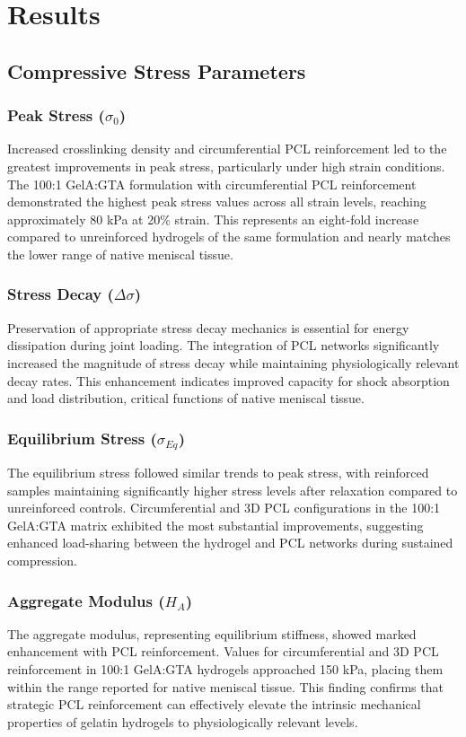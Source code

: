 \section{Results}
\subsection{Compressive Stress Parameters}

\subsubsection{Peak Stress ($\sigma_0$)}
Increased crosslinking density and circumferential PCL reinforcement led to the greatest improvements in peak stress, particularly under high strain conditions. The 100:1 GelA:GTA formulation with circumferential PCL reinforcement demonstrated the highest peak stress values across all strain levels, reaching approximately 80 kPa at 20\% strain. This represents an eight-fold increase compared to unreinforced hydrogels of the same formulation and nearly matches the lower range of native meniscal tissue.

\subsubsection{Stress Decay ($\Delta\sigma$)}
Preservation of appropriate stress decay mechanics is essential for energy dissipation during joint loading. The integration of PCL networks significantly increased the magnitude of stress decay while maintaining physiologically relevant decay rates. This enhancement indicates improved capacity for shock absorption and load distribution, critical functions of native meniscal tissue.

\subsubsection{Equilibrium Stress ($\sigma_{Eq}$)}
The equilibrium stress followed similar trends to peak stress, with reinforced samples maintaining significantly higher stress levels after relaxation compared to unreinforced controls. Circumferential and 3D PCL configurations in the 100:1 GelA:GTA matrix exhibited the most substantial improvements, suggesting enhanced load-sharing between the hydrogel and PCL networks during sustained compression.

\subsubsection{Aggregate Modulus ($H_A$)}
The aggregate modulus, representing equilibrium stiffness, showed marked enhancement with PCL reinforcement. Values for circumferential and 3D PCL reinforcement in 100:1 GelA:GTA hydrogels approached 150 kPa, placing them within the range reported for native meniscal tissue. This finding confirms that strategic PCL reinforcement can effectively elevate the intrinsic mechanical properties of gelatin hydrogels to physiologically relevant levels.

